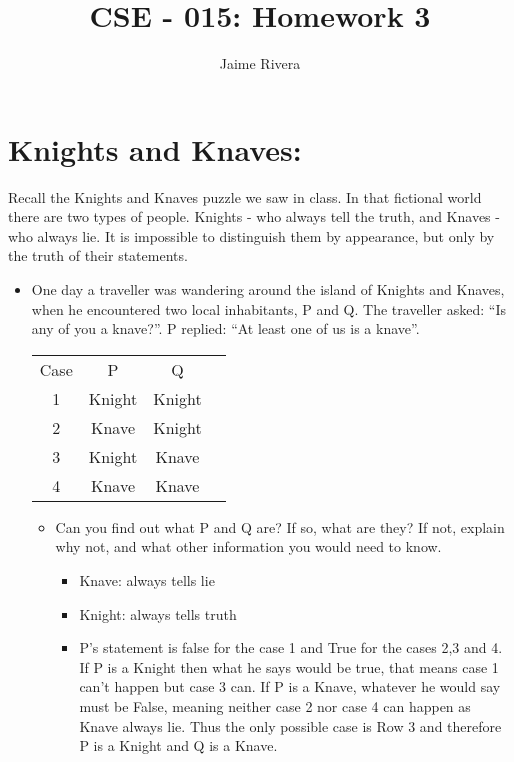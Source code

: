 \documentclass[11pt]{article}
\title{CSE - 015: Homework 3}
\author{Jaime Rivera}
\begin{document}
\maketitle



\section{Knights and Knaves:}
Recall the Knights and Knaves puzzle we saw in class. In that fictional world there are two types of people.
Knights - who always tell the truth, and Knaves - who always lie. It is impossible to distinguish them by
appearance, but only by the truth of their statements.

\begin{itemize}
\item One day a traveller was wandering around the island of Knights and Knaves, when he encountered
two local inhabitants, P and Q. The traveller asked: “Is any of you a knave?”. P replied: “At least
one of us is a knave”.

\begin{center}
\begin{tabular}{ |c|c|c|c| } 
 \hline
Case & P & Q \\ 
1 & Knight & Knight \\ 
2 & Knave & Knight \\ 
3 & Knight & Knave \\
4 & Knave & Knave \\
 \hline
\end{tabular}
\end{center}

\begin{itemize}
\item Can you find out what P and Q are? If so, what are they? If not, explain why not, and what other
information you would need to know. 
\begin{itemize}
\item Knave: always tells lie
\item Knight: always tells truth 
\item P's statement is false for the case 1 and True for the cases 2,3 and 4. If P is a Knight then what he says would be true, that means case 1 can't happen but case 3 can. If P is a Knave, whatever he would say must be False, meaning neither case 2 nor case 4 can happen as Knave always lie. Thus the only possible case is Row 3 and therefore P is a Knight and Q is a Knave.
\end{itemize}
\end{itemize}
\end{itemize} 
 
\end{document}
